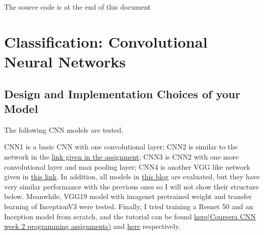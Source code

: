 \documentclass[12pt]{article}
\begin{document}
\noindent
{\LARGE The source code is at the end of this document}
\section{Classification: Convolutional Neural Networks}

\subsection{Design and Implementation Choices of your Model}

The following CNN models are tested. 

CNN1 is a basic CNN with one convolutional layer; CNN2 is similar to the network in the \href{https://www.kaggle.com/fuzzywizard/fashion-mnist-cnn-keras-accuracy-93/}{link given in the assignment}; CNN3 is CNN2 with one more convolutional layer and max pooling layer; CNN4 is another VGG like network given in \href{http://proc-x.com/2017/09/a-vgg-like-cnn-for-fashion-mnist-with-94-accuracy/}{this link}. In addition, all models in \href{https://solvemprobler.com/blog/2017/09/29/range-of-convolutional-neural-networks-on-fashion-mnist-dataset/}{this blog} are evaluated, but they have very similar performance with the previous ones so I will not show their structure below. Meanwhile, VGG19 model with imagenet pretrained weight and transfer learning of InceptionV3 were tested. Finally, I tried training a Resnet 50 and an Inception model from scratch, and the tutorial can be found \href{https://www.coursera.org/learn/convolutional-neural-networks?specialization=deep-learning#syllabus}{here(Coursera CNN week 2 programming assignments)} and \href{https://machinelearningmastery.com/how-to-implement-major-architecture-innovations-for-convolutional-neural-networks/}{here} respectively.
\end{document}
